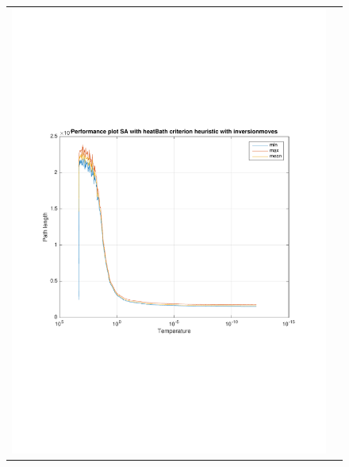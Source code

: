 \documentclass[a4paper, 11pt]{scrartcl}
\begin{document}
\begin{figure}[!ht]
\begin{tabular}{cc}
    \includegraphics[scale=0.4, trim={3cm 6cm 1cm 6cm}]{../figures/perfPlot_SA_heatBath_inversion.pdf} & 

\end{tabular}
\end{figure}
\end{document}

